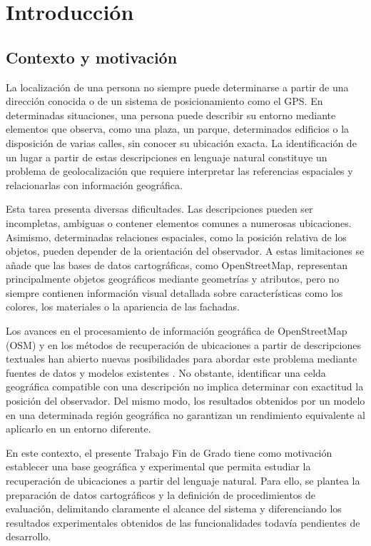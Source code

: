 \chapter{Introducción}
\label{cap:introduccion}

\section{Contexto y motivación}
\label{sec:motivacion}
La localización de una persona no siempre puede determinarse a partir de una dirección conocida o de un sistema de posicionamiento como el GPS. En determinadas situaciones, una persona puede describir su entorno mediante elementos que observa, como una plaza, un parque, determinados edificios o la disposición de varias calles, sin conocer su ubicación exacta. La identificación de un lugar a partir de estas descripciones en lenguaje natural constituye un problema de geolocalización que requiere interpretar las referencias espaciales y relacionarlas con información geográfica.

Esta tarea presenta diversas dificultades. Las descripciones pueden ser incompletas, ambiguas o contener elementos comunes a numerosas ubicaciones. Asimismo, determinadas relaciones espaciales, como la posición relativa de los objetos, pueden depender de la orientación del observador. A estas limitaciones se añade que las bases de datos cartográficas, como OpenStreetMap, representan principalmente objetos geográficos mediante geometrías y atributos, pero no siempre contienen información visual detallada sobre características como los colores, los materiales o la apariencia de las fachadas.

Los avances en el procesamiento de información geográfica de OpenStreetMap (OSM) y en los métodos de recuperación de ubicaciones a partir de descripciones textuales han abierto nuevas posibilidades para abordar este problema mediante fuentes de datos y modelos existentes \cite{khellaf2025spot,ye2025crosstext,jung2025gotpr}. No obstante, identificar una celda geográfica compatible con una descripción no implica determinar con exactitud la posición del observador. Del mismo modo, los resultados obtenidos por un modelo en una determinada región geográfica no garantizan un rendimiento equivalente al aplicarlo en un entorno diferente.

En este contexto, el presente Trabajo Fin de Grado tiene como motivación establecer una base geográfica y experimental que permita estudiar la recuperación de ubicaciones a partir del lenguaje natural. Para ello, se plantea la preparación de datos cartográficos y la definición de procedimientos de evaluación, delimitando claramente el alcance del sistema y diferenciando los resultados experimentales obtenidos de las funcionalidades todavía pendientes de desarrollo.
